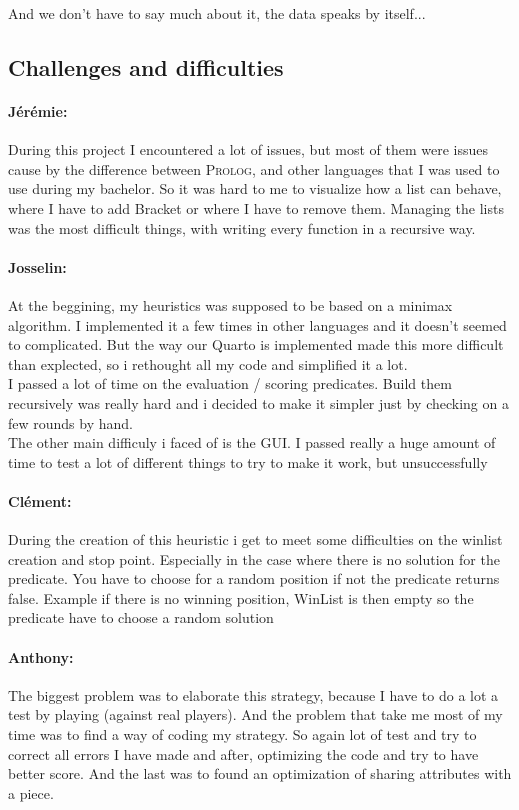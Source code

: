\documentclass[a4paper,11pt]{article}
\begin{document}
			And we don't have to say much about it, the data speaks by itself...
		
		\subsection{Challenges and difficulties}
			\paragraph{Jérémie: } During this project I encountered a lot of issues, but most of them were issues cause by the difference between \textsc{Prolog}, and other languages that I was used to use during my bachelor. So it was hard to me to visualize how a list can behave, where I have to add Bracket or where I have to remove them. Managing the lists was the most difficult things, with writing every function in a recursive way.

			\paragraph{Josselin:} At the beggining, my heuristics was supposed to be based on a minimax algorithm. I implemented it a few times in other languages and it doesn't seemed to complicated. But the way our Quarto is implemented made this more difficult than explected, so i rethought all my code and simplified it a lot. \\
			I passed a lot of time on the evaluation / scoring predicates. Build them recursively was really hard and i decided to make it simpler just by checking on a few rounds by hand. \\
			The other main difficuly i faced of is the GUI. I passed really a huge amount of time to test a lot of different things to try to make it work, but unsuccessfully

			\paragraph{Clément:} During the creation of this heuristic i get to meet some difficulties on the winlist creation and stop point. Especially in the case where there is no solution for the predicate. You have to choose for a random position if not the predicate returns false. Example if there is no winning position, WinList is then empty so the predicate have to choose a random solution

			\paragraph{Anthony:} The biggest problem was to elaborate this strategy, because I have to do a lot a test by playing (against real players). And the problem that take me most of my time was to find a way of coding my strategy. So again lot of test and try to correct all errors I have made and after, optimizing the code and try to have better score. And the last was to found an optimization of sharing attributes with a piece.
	
\end{document}

